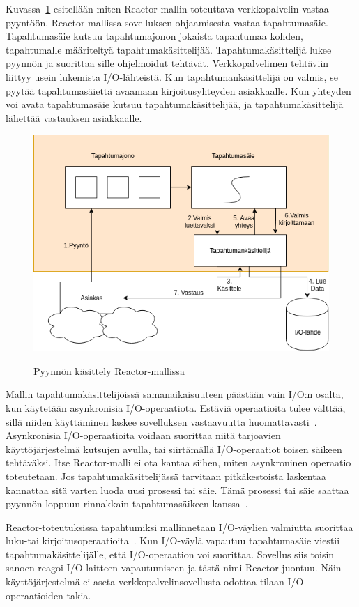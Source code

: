 \documentclass[finnish]{tktltiki2}
\theoremstyle{definition}
\theoremstyle{remark}
\begin{document}
Kuvassa~\ref{fig:reactor} esitellään miten Reactor-mallin toteuttava verkkopalvelin
vastaa pyyntöön.
Reactor mallissa sovelluksen ohjaamisesta vastaa tapahtumasäie.
Tapahtumasäie kutsuu tapahtumajonon jokaista tapahtumaa kohden, tapahtumalle
määriteltyä tapahtumakäsittelijää. Tapahtumakäsittelijä
lukee pyynnön ja suorittaa sille ohjelmoidut tehtävät. Verkkopalvelimen
tehtäviin liittyy usein lukemista I/O-lähteistä.
Kun tapahtumankäsittelijä on valmis, se pyytää tapahtumasäiettä
avaamaan kirjoitusyhteyden asiakkaalle. Kun yhteyden voi avata
tapahtumasäie kutsuu tapahtumakäsittelijää, ja tapahtumakäsittelijä lähettää vastauksen
asiakkaalle.
\begin{figure}
  \centering
  \caption{Pyynnön käsittely Reactor-mallissa}
  \includegraphics[scale=0.5]{reactor.png}\label{fig:reactor}
\end{figure}

Mallin tapahtumakäsittelijöissä samanaikaisuuteen päästään
vain I/O:n osalta, kun käytetään asynkronisia
I/O-operaatiota.
Estäviä operaatioita tulee välttää,
sillä niiden käyttäminen laskee sovelluksen
vastaavuutta huomattavasti~\cite{schmidt_reactor:_1995}.
Asynkronisia I/O-operaatioita
voidaan suorittaa niitä tarjoavien käyttöjärjestelmä kutsujen
avulla, tai siirtämällä I/O-operaatiot toisen säikeen tehtäväksi.
Itse Reactor-malli ei ota kantaa siihen, miten asynkroninen operaatio toteutetaan.
Jos tapahtumakäsittelijässä tarvitaan pitkäkestoista laskentaa
kannattaa sitä varten luoda uusi prosessi tai säie. Tämä
prosessi tai säie saattaa pyynnön loppuun rinnakkain
tapahtumasäikeen kanssa~\cite{schmidt_reactor:_1995}.

Reactor-toteutuksissa tapahtumiksi mallinnetaan I/O-väylien
valmiutta suorittaa luku-tai kirjoitusoperaatioita~\cite{schmidt_reactor:_1995}.
Kun I/O-väylä
vapautuu tapahtumasäie viestii tapahtumakäsittelijälle, että 
I/O-operaation voi suorittaa. Sovellus siis toisin sanoen
reagoi I/O-laitteen vapautumiseen ja tästä nimi Reactor juontuu.
Näin käyttöjärjestelmä ei aseta
verkkopalvelinsovellusta odottaa tilaan I/O-operaatioiden takia.
\end{document}
